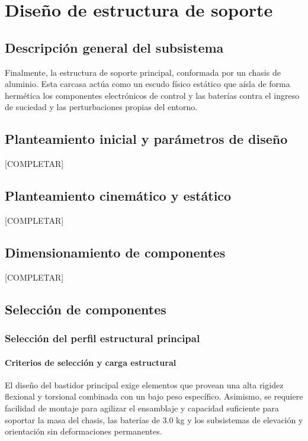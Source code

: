 \documentclass[../../General.tex]{subfiles}
\begin{document}
\section{Diseño de estructura de soporte}

\subsection{Descripción general del subsistema}

Finalmente, la estructura de soporte principal, conformada por un chasis de aluminio. Esta carcasa actúa como un escudo físico estático que aísla de forma hermética los componentes electrónicos de control y las baterías contra el ingreso de suciedad y las perturbaciones propias del entorno.

\subsection{Planteamiento inicial y parámetros de diseño}

[COMPLETAR]

\subsection{Planteamiento cinemático y estático}

[COMPLETAR]

\subsection{Dimensionamiento de componentes}

[COMPLETAR]

\subsection{Selección de componentes}

\subsubsection{Selección del perfil estructural principal}

\paragraph{Criterios de selección y carga estructural}
El diseño del bastidor principal exige elementos que provean una alta rigidez flexional y torsional combinada con un bajo peso específico. Asimismo, se requiere facilidad de montaje para agilizar el ensamblaje y capacidad suficiente para soportar la masa del chasis, las baterías de 3.0 kg y los subsistemas de elevación y orientación sin deformaciones permanentes.
\end{document}
